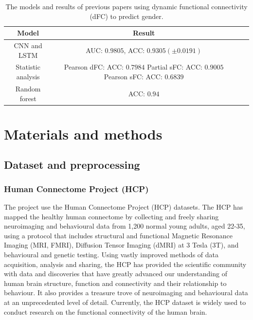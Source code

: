 \documentclass[11pt]{article}
\begin{document}
\begin{table}[H]
    \centering
    \begin{tabular}{|c|c|c|c|}
        \hline
        Model                          & Result                                    \\
        \hline
        CNN and LSTM\cite{Fan2020-ql}  & AUC: $0.9805$, ACC: $0.9305 (\pm 0.0191)$
        \\
        \hline
        Statistic analysis\cite{Menon2019-ef}
                                       & \makecell{Pearson dFC: ACC: $0.7984$      \\
        Partial sFC: ACC: $0.9005$                                                 \\
            Pearson sFC: ACC: $0.6839$}
        \\
        \hline
        Random forest\cite{Sen2021-ws} & ACC: $0.94$                               \\
        \hline
    \end{tabular}
    \caption{The models and results of previous papers using dynamic functional connectivity (dFC) to predict gender.}
    \label{intro-dfc-results}
\end{table}

\section{Materials and methods}

\subsection{Dataset and preprocessing}

\subsubsection{Human Connectome Project (HCP)}

The project use the Human Connectome Project (HCP) datasets\cite{Glasser2013-ha}\cite{Van_Essen2012-gc}. The HCP has mapped the healthy human connectome by collecting and freely sharing neuroimaging and behavioural data from 1,200 normal young adults, aged 22-35, using a protocol that includes structural and functional Magnetic Resonance Imaging (MRI, FMRI), Diffusion Tensor Imaging (dMRI) at 3 Tesla (3T), and behavioural and genetic testing. Using vastly improved methods of data acquisition, analysis and sharing, the HCP has provided the scientific community with data and discoveries that have greatly advanced our understanding of human brain structure, function and connectivity and their relationship to behaviour. It also provides a treasure trove of neuroimaging and behavioural data at an unprecedented level of detail. Currently, the HCP dataset is widely used to conduct research on the functional connectivity of the human brain.
\end{document}
